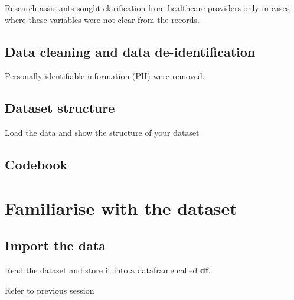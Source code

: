 \documentclass[
  letterpaper,
  DIV=11,
  numbers=noendperiod]{scrreprt}
\begin{document}
Research assistants sought clarification from healthcare providers only
in cases where these variables were not clear from the records.

\hypertarget{data-cleaning-and-data-de-identification}{%
\section{Data cleaning and data
de-identification}\label{data-cleaning-and-data-de-identification}}

Personally identifiable information (PII) were removed.

\hypertarget{dataset-structure}{%
\section{Dataset structure}\label{dataset-structure}}

Load the data and show the structure of your dataset

\hypertarget{codebook}{%
\section{Codebook}\label{codebook}}


\hypertarget{familiarise-with-the-dataset}{%
\chapter{Familiarise with the
dataset}\label{familiarise-with-the-dataset}}

\hypertarget{import-the-data}{%
\section{Import the data}\label{import-the-data}}

Read the dataset and store it into a dataframe called \textbf{df}.

\begin{tcolorbox}[enhanced jigsaw, left=2mm, colback=white, coltitle=black, toptitle=1mm, bottomrule=.15mm, rightrule=.15mm, leftrule=.75mm, bottomtitle=1mm, colbacktitle=quarto-callout-tip-color!10!white, opacityback=0, arc=.35mm, colframe=quarto-callout-tip-color-frame, titlerule=0mm, title=\textcolor{quarto-callout-tip-color}{\faLightbulb}\hspace{0.5em}{Tip}, breakable, toprule=.15mm, opacitybacktitle=0.6]
Refer to previous session
\end{tcolorbox}
\end{document}

